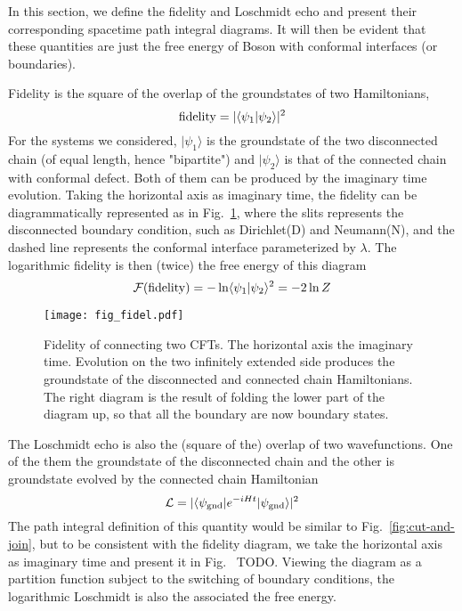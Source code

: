 
In this section, we define the fidelity and Loschmidt echo and present their corresponding spacetime path integral diagrams. It will then be evident that these quantities are just the free energy of Boson with conformal interfaces (or boundaries). 

Fidelity is the square of the overlap of the groundstates of two Hamiltonians, 
\begin{equation}
{\rm fidelity} = |\langle \psi_1 |\psi_2  \rangle |^2 
\end{equation}
For the systems we considered, $|\psi_1 \rangle$ is the groundstate of the two disconnected chain (of equal length, hence "bipartite") and $|\psi_2\rangle$ is that of the connected chain with conformal defect. Both of them can be produced by the imaginary time evolution. Taking the horizontal axis as imaginary time, the fidelity can be diagrammatically represented as in Fig.~\ref{fig:fidel}, where the slits represents the disconnected boundary condition, such as Dirichlet(D) and Neumann(N), and the dashed line represents the conformal interface parameterized by $\lambda$. The logarithmic fidelity is then (twice) the free energy of this diagram
\begin{equation}
\mathcal{F}( {\rm fidelity} )  = - \ln \langle \psi_1 |\psi_2 \rangle^2 = - 2 \ln Z
\end{equation}

\begin{figure}[h]
\centering
\texttt{[image: fig\_fidel.pdf]}
\caption{Fidelity of connecting two CFTs. The horizontal axis the imaginary time. Evolution on the two infinitely extended side produces the groundstate of the disconnected and connected chain Hamiltonians. The right diagram is the result of folding the lower part of the diagram up, so that all the boundary are now boundary states.}
\label{fig:fidel}
\end{figure}


The Loschmidt echo is also the (square of the) overlap of two wavefunctions. One of the them the groundstate of the disconnected chain and the other is groundstate evolved by the connected chain Hamiltonian
\begin{equation}
\mathcal{L} = |\langle \psi_{\rm gnd}  | e^{-i H t } | \psi_{\rm gnd} \rangle|^2
\end{equation}
The path integral definition of this quantity would be similar to Fig.~\ref{fig:cut-and-join}, but to be consistent with the fidelity diagram, we take the horizontal axis as imaginary time and present it in Fig.~{\color{red} TODO}. Viewing the diagram as a partition function subject to the switching of boundary conditions, the logarithmic Loschmidt is also the associated the free energy.

